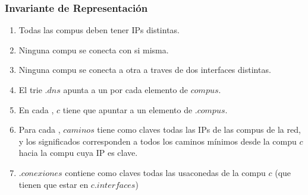 \subsubsection{Invariante de Representación}
  \begin{enumerate}

  \item Todas las compus deben tener IPs distintas.

  \item Ninguna compu se conecta con si misma.

  \item Ninguna compu se conecta a otra a traves de dos interfaces distintas.

  \item El trie .$dns$ apunta a un 
        por cada elemento de $compus$.

  \item En cada , $c$ tiene que apuntar a un elemento de .$compus$.

  \item Para cada , $caminos$ tiene como claves todas las
        IPs de las compus de la red, y los significados corresponden a todos los caminos
        mínimos desde la compu $c$ hacia la compu cuya IP es clave.

  \item {}.$conexiones$ contiene como claves todas las
         usaconedas de la compu $c$ (que tienen que estar en $c$.$interfaces$)

  \end{enumerate}

  \Rep[estr][e]{

  }

